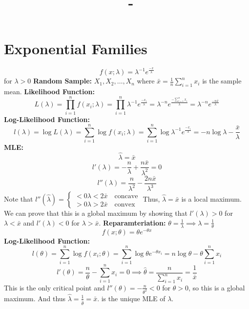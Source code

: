 \documentclass[answers,12pt,addpoints]{exam}
\author{\name}
\title{\course \ - \assignment}
\begin{document}
\maketitle

\newpage
\section{Exponential Families}
\begin{definition}
    $$f(x;\lambda) = \lambda^{-1} e^{\frac{-x}{\lambda}}$$ 
    for $\lambda > 0$ 
    \textbf{Random Sample:} $X_1, X_2, \ldots, X_n$ 
    where $\bar{x} = \frac{1}{n} \sum_{i=1}^{n} x_i$ is the sample mean.
    \textbf{Likelihood Function:}
    $$L(\lambda) = \prod_{i=1}^{n} f(x_i;\lambda) = \prod_{i=1}^{n} \lambda^{-1} e^{\frac{-x_i}{\lambda}} = \lambda^{-n} e^{\frac{-\sum_{i=1}^{n} x_i}{\lambda}} = \lambda^{-n} e^{\frac{-n\bar{x}}{\lambda}}$$
    \textbf{Log-Likelihood Function:}
    $$l(\lambda) = \log L(\lambda) = \sum_{i=1}^{n} \log f(x_i;\lambda) = \sum_{i=1}^{n} \log \lambda^{-1} e^{\frac{-x_i}{\lambda}} = -n \log \lambda - \frac{\bar{x}}{\lambda}$$
    \textbf{MLE:} 
    $$ \hat{\lambda} = \bar{x}$$
    $$ l'(\lambda) = -\frac{n}{\lambda} + \frac{n\bar{x}}{\lambda^2} = 0$$
    $$ l''(\lambda) = \frac{n}{\lambda^2} - \frac{2n\bar{x}}{\lambda^3}$$
    Note that $l''(\hat{\lambda}) = \begin{cases}
        <0 \lambda < 2\bar{x} \quad \text{concave}\\
        >0 \lambda > 2\bar{x} \quad \text{convex}
    \end{cases}$
    Thus, $\hat{\lambda} = \bar{x}$ is a local maximum.
    We can prove that this is a global maximum by showing that $l'(\lambda) > 0$ for $\lambda < \bar{x}$ and $l'(\lambda) < 0$ for $\lambda > \bar{x}$.
    \textbf{Reparamteriation:} $\theta = \frac{1}{\lambda} \implies \lambda = \frac{1}{\theta}$
    $$f(x;\theta) = \theta e^{-\theta x}$$
    \textbf{Log-Likelihood Function:}
    $$l(\theta) = \sum_{i=1}^{n} \log f(x_i;\theta) = \sum_{i=1}^{n} \log \theta e^{-\theta x_i} = n\log \theta - \theta \sum_{i=1}^{n} x_i$$
    $$l'(\theta) = \frac{n}{\theta} - \sum_{i=1}^{n} x_i = 0 \implies \hat{\theta} = \frac{n}{\sum_{i=1}^{n} x_i} = \frac{1}{\bar{x}}$$
    This is the only critical point and $l''(\theta) = -\frac{n}{\theta^2} < 0$ for $\theta > 0$, so this is a global maximum. And thus $\hat{\lambda} = \frac{1}{\hat{\theta}} = \bar{x}$. is the unique MLE of $\lambda$.
\end{definition}
\end{document}
